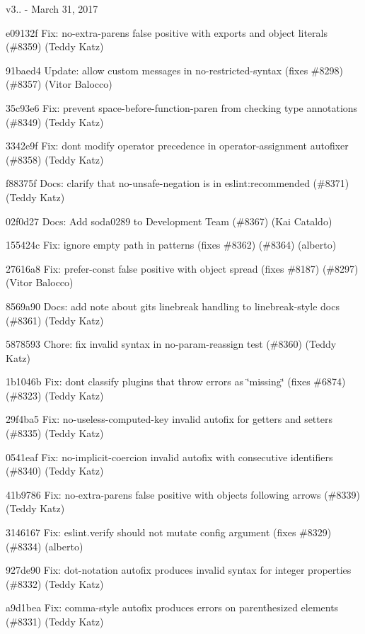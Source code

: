v3.. -\/ March 31, 2017


\begin{DoxyItemize}
\item e09132f Fix\+: no-\/extra-\/parens false positive with exports and object literals (\#8359) (Teddy Katz)
\item 91baed4 Update\+: allow custom messages in no-\/restricted-\/syntax (fixes \#8298) (\#8357) (Vitor Balocco)
\item 35c93e6 Fix\+: prevent space-\/before-\/function-\/paren from checking type annotations (\#8349) (Teddy Katz)
\item 3342e9f Fix\+: don\textquotesingle{}t modify operator precedence in operator-\/assignment autofixer (\#8358) (Teddy Katz)
\item f88375f Docs\+: clarify that no-\/unsafe-\/negation is in eslint\+:recommended (\#8371) (Teddy Katz)
\item 02f0d27 Docs\+: Add soda0289 to Development Team (\#8367) (Kai Cataldo)
\item 155424c Fix\+: ignore empty path in patterns (fixes \#8362) (\#8364) (alberto)
\item 27616a8 Fix\+: prefer-\/const false positive with object spread (fixes \#8187) (\#8297) (Vitor Balocco)
\item 8569a90 Docs\+: add note about git\textquotesingle{}s linebreak handling to linebreak-\/style docs (\#8361) (Teddy Katz)
\item 5878593 Chore\+: fix invalid syntax in no-\/param-\/reassign test (\#8360) (Teddy Katz)
\item 1b1046b Fix\+: don\textquotesingle{}t classify plugins that throw errors as \char`\"{}missing\char`\"{} (fixes \#6874) (\#8323) (Teddy Katz)
\item 29f4ba5 Fix\+: no-\/useless-\/computed-\/key invalid autofix for getters and setters (\#8335) (Teddy Katz)
\item 0541eaf Fix\+: no-\/implicit-\/coercion invalid autofix with consecutive identifiers (\#8340) (Teddy Katz)
\item 41b9786 Fix\+: no-\/extra-\/parens false positive with objects following arrows (\#8339) (Teddy Katz)
\item 3146167 Fix\+: {\ttfamily eslint.\+verify} should not mutate config argument (fixes \#8329) (\#8334) (alberto)
\item 927de90 Fix\+: dot-\/notation autofix produces invalid syntax for integer properties (\#8332) (Teddy Katz)
\item a9d1bea Fix\+: comma-\/style autofix produces errors on parenthesized elements (\#8331) (Teddy Katz)

\end{DoxyItemize}
